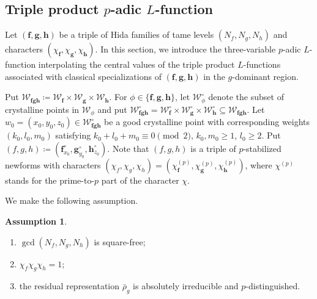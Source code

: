 \documentclass[a4paper,11pt]{amsart}
\theoremstyle{plain}
\theoremstyle{definition}
\newtheorem{ass}[theorem]{Assumption}
\theoremstyle{remark}
\newcommand{\cl}{\mathcal}
\newcommand{\hf}{{\mathbf{f}}}
\newcommand{\hg}{{\mathbf{g}}}
\newcommand{\hh}{{\mathbf h}}
\numberwithin{equation}{section}
\begin{document}
\subsection{Triple product $p$-adic $L$-function}\label{subsec:tripleproduct}

Let $(\hf,\hg,\hh)$ be a triple of Hida families of tame levels $(N_f,N_g,N_h)$ and characters $(\chi_{\hf},\chi_{\hg},\chi_{\hh})$. In this section, we introduce the three-variable $p$-adic $L$-function interpolating the central values of the triple product $L$-functions associated with classical specializations of $(\hf,\hg,\hh)$ in the $g$-dominant region. %

Put $\cl{W}_{\hf \hg \hh}\coloneqq \cl{W}_{\hf}\times \cl{W}_{\hg}\times \cl{W}_{\hh}$. For $\phi\in\lbrace \hf,\hg,\hh\rbrace$, let $\cl{W}_{\phi}^\circ$ denote the subset of crystalline points in $\cl{W}_{\phi}$ and put $\cl{W}_{\hf \hg \hh}^{\circ}=\cl{W}_{\hf}^{\circ} \times \cl{W}_{\hg}^{\circ} \times \cl{W}_{\hh}^{\circ}\subseteq \cl{W}_{\hf \hg \hh}$. Let $w_0=(x_0,y_0,z_0)\in \cl{W}_{\hf \hg \hh}^\circ$ be a good crystalline point with corresponding weights $(k_0,l_0,m_0)$ satisfying $k_{0}+l_{0}+m_{0}\equiv 0\pmod{2}$, $k_0,m_0\geq 1$, $l_0\geq 2$. Put $(f,g,h)\coloneqq (\hf_{x_0}^\circ,\hg_{y_0}^\circ,\hh_{z_0}^\circ)$. Note that $(f,g,h)$ is a triple of $p$-stabilized newforms with characters $(\chi_f,\chi_g,\chi_h)=(\chi_{\hf}^{(p)},\chi_{\hg}^{(p)},\chi_{\hh}^{(p)})$, where $\chi^{(p)}$ stands for the prime-to-$p$ part of the character $\chi$. %

We make the following assumption.

\begin{ass} 
\hfill
    \begin{enumerate}
        \item $\gcd(N_f,N_g,N_h)$ is square-free;
        \item $\chi_f\chi_g\chi_h=1$;
        \item the residual representation $\bar{\rho}_{g}$ is absolutely irreducible and $p$-distinguished.
    \end{enumerate}
\end{ass}
\end{document}
